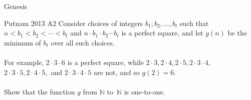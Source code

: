 \documentclass{beamer}
\begin{document}

\begin{frame}{Genesis}
  \begin{block}{Putnam 2013 A2}
    Consider choices of integers $b_1,b_2,\dots, b_t$ such that
    $n<b_1<b_2<\cdots<b_t$ and $n\cdot b_1\cdot b_2\cdots b_t$ is a perfect square,
    and let $g(n)$ be the minimum of $b_t$ over all such choices.
    \\ ~ \\
    For example, $2\cdot 3\cdot 6$ is a perfect square, while
    $2\cdot 3,2\cdot 4, 2\cdot 5, 2\cdot 3\cdot 4,$ $2\cdot 3\cdot 5, 2\cdot 4\cdot 5,$
    and $2\cdot 3\cdot 4\cdot 5$ are not, and so $g(2)=6.$
    \\ ~ \\
    Show that the function $g$ from $\mathbb{N}$ to\
     $\mathbb{N}$ is
    one-to-one.
  \end{block}
\end{frame}
\end{document}
